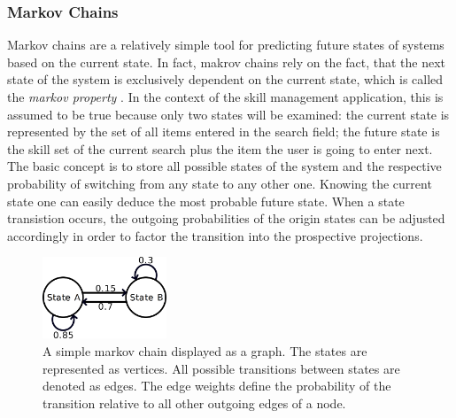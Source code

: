 \subsubsection{Markov Chains}
Markov chains are a relatively simple tool for predicting future states of systems based on the current state. In fact, makrov chains rely on the fact, that the next state of the system is exclusively dependent on the current state, which is called the \textit{markov property} \cite{markprop}. In the context of the skill management application, this is assumed to be true because only two states will be examined: the current state is represented by the set of all items entered in the search field; the future state is the skill set of the current search plus the item the user is going to enter next.
The basic concept is to store all possible states of the system and the respective probability of switching from any state to any other one.
Knowing the current state one can easily deduce the most probable future state. When a state transistion occurs, the outgoing probabilities of the origin states
can be adjusted accordingly in order to factor the transition into the prospective projections.
\begin{figure}[!htp]
    \centering
    \includegraphics[width=0.33\textwidth]{images/markov-chain.png}
    \caption[Diagram: Markov Chain]{A simple markov chain displayed as a graph. The states are represented as vertices. All possible transitions between states are denoted as edges. The edge weights define the probability of the transition relative to all other outgoing edges of a node.}
    \label{fig:markovchain}
\end{figure}

\newpage

